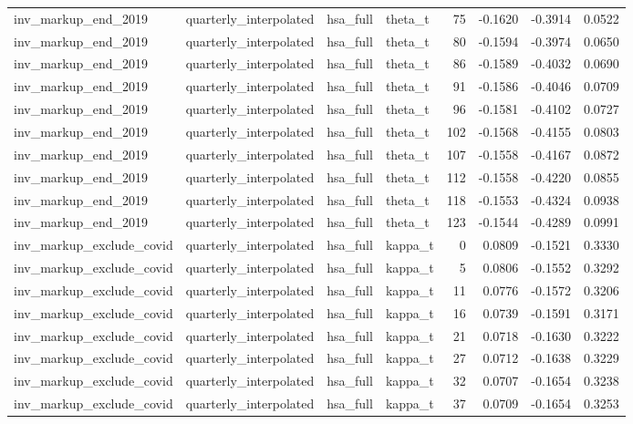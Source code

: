 \begin{tabular}{llllrrrr}
inv\_markup\_end\_2019 & quarterly\_interpolated & hsa\_full & theta\_t & 75 & -0.1620 & -0.3914 & 0.0522 \\
inv\_markup\_end\_2019 & quarterly\_interpolated & hsa\_full & theta\_t & 80 & -0.1594 & -0.3974 & 0.0650 \\
inv\_markup\_end\_2019 & quarterly\_interpolated & hsa\_full & theta\_t & 86 & -0.1589 & -0.4032 & 0.0690 \\
inv\_markup\_end\_2019 & quarterly\_interpolated & hsa\_full & theta\_t & 91 & -0.1586 & -0.4046 & 0.0709 \\
inv\_markup\_end\_2019 & quarterly\_interpolated & hsa\_full & theta\_t & 96 & -0.1581 & -0.4102 & 0.0727 \\
inv\_markup\_end\_2019 & quarterly\_interpolated & hsa\_full & theta\_t & 102 & -0.1568 & -0.4155 & 0.0803 \\
inv\_markup\_end\_2019 & quarterly\_interpolated & hsa\_full & theta\_t & 107 & -0.1558 & -0.4167 & 0.0872 \\
inv\_markup\_end\_2019 & quarterly\_interpolated & hsa\_full & theta\_t & 112 & -0.1558 & -0.4220 & 0.0855 \\
inv\_markup\_end\_2019 & quarterly\_interpolated & hsa\_full & theta\_t & 118 & -0.1553 & -0.4324 & 0.0938 \\
inv\_markup\_end\_2019 & quarterly\_interpolated & hsa\_full & theta\_t & 123 & -0.1544 & -0.4289 & 0.0991 \\
inv\_markup\_exclude\_covid & quarterly\_interpolated & hsa\_full & kappa\_t & 0 & 0.0809 & -0.1521 & 0.3330 \\
inv\_markup\_exclude\_covid & quarterly\_interpolated & hsa\_full & kappa\_t & 5 & 0.0806 & -0.1552 & 0.3292 \\
inv\_markup\_exclude\_covid & quarterly\_interpolated & hsa\_full & kappa\_t & 11 & 0.0776 & -0.1572 & 0.3206 \\
inv\_markup\_exclude\_covid & quarterly\_interpolated & hsa\_full & kappa\_t & 16 & 0.0739 & -0.1591 & 0.3171 \\
inv\_markup\_exclude\_covid & quarterly\_interpolated & hsa\_full & kappa\_t & 21 & 0.0718 & -0.1630 & 0.3222 \\
inv\_markup\_exclude\_covid & quarterly\_interpolated & hsa\_full & kappa\_t & 27 & 0.0712 & -0.1638 & 0.3229 \\
inv\_markup\_exclude\_covid & quarterly\_interpolated & hsa\_full & kappa\_t & 32 & 0.0707 & -0.1654 & 0.3238 \\
inv\_markup\_exclude\_covid & quarterly\_interpolated & hsa\_full & kappa\_t & 37 & 0.0709 & -0.1654 & 0.3253 \\

\end{tabular}
